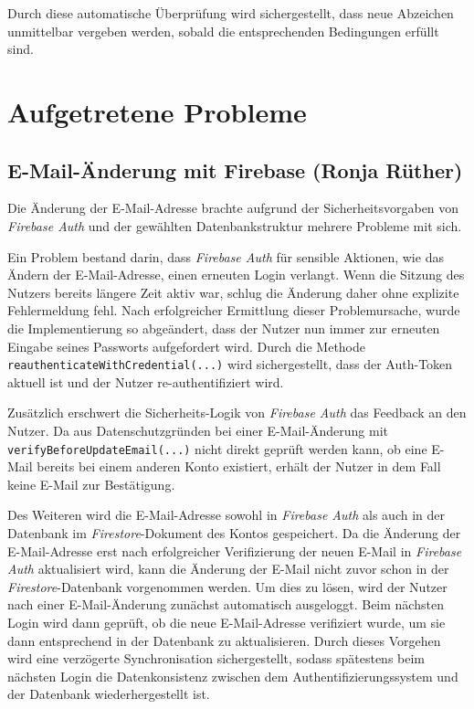 Durch diese automatische Überprüfung wird sichergestellt, dass neue Abzeichen unmittelbar vergeben werden, sobald die entsprechenden Bedingungen erfüllt sind.

\section{Aufgetretene Probleme}

\subsection{E-Mail-Änderung mit Firebase (Ronja Rüther)}
Die Änderung der E-Mail-Adresse brachte aufgrund der Sicherheitsvorgaben von \textit{Firebase Auth} und der gewählten Datenbankstruktur mehrere Probleme mit sich.

Ein Problem bestand darin, dass \textit{Firebase Auth} für sensible Aktionen, wie das Ändern der E-Mail-Adresse, einen erneuten Login verlangt. Wenn die Sitzung des Nutzers bereits längere Zeit aktiv war, schlug die Änderung 
daher ohne explizite Fehlermeldung fehl. Nach erfolgreicher Ermittlung dieser Problemursache, wurde die Implementierung so abgeändert, dass der Nutzer nun immer zur erneuten Eingabe seines Passworts aufgefordert wird. Durch die Methode 
\texttt{reauthenticateWithCredential(...)} wird sichergestellt, dass der Auth-Token aktuell ist und der Nutzer re-authentifiziert wird.

Zusätzlich erschwert die Sicherheits-Logik von \textit{Firebase Auth} das Feedback an den Nutzer. Da aus Datenschutzgründen bei einer E-Mail-Änderung mit \texttt{verifyBeforeUpdateEmail(...)} nicht direkt geprüft werden kann, ob eine E-Mail bereits bei einem 
anderen Konto existiert, erhält der Nutzer in dem Fall keine E-Mail zur Bestätigung.

Des Weiteren wird die E-Mail-Adresse sowohl in \textit{Firebase Auth} als auch in der Datenbank im \textit{Firestore}-Dokument des Kontos gespeichert. 
Da die Änderung der E-Mail-Adresse erst nach erfolgreicher Verifizierung der neuen E-Mail in \textit{Firebase Auth} aktualisiert wird, kann die Änderung der E-Mail nicht zuvor schon 
in der \textit{Firestore}-Datenbank vorgenommen werden. Um dies zu lösen, wird der Nutzer nach einer E-Mail-Änderung zunächst automatisch ausgeloggt. 
Beim nächsten Login wird dann geprüft, ob die neue E-Mail-Adresse verifiziert wurde, um sie dann entsprechend in der Datenbank zu aktualisieren.
Durch dieses Vorgehen wird eine verzögerte Synchronisation sichergestellt, sodass spätestens beim nächsten Login die Datenkonsistenz zwischen dem Authentifizierungssystem und der Datenbank wiederhergestellt ist.

